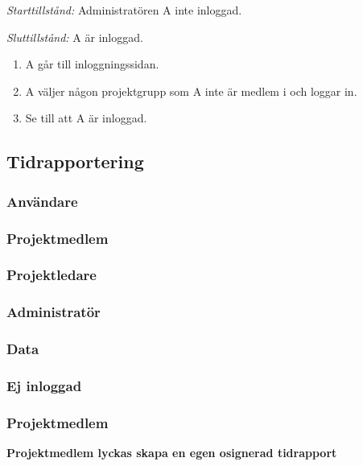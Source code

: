 \documentclass[a4paper]{article}
\begin{document}
\begin{FT}
\emph{Starttillstånd:} Administratören A inte inloggad.

\emph{Sluttillstånd:} A är inloggad.

\begin{enumerate}
\item A går till inloggningssidan.
\item A väljer någon projektgrupp som A inte är medlem i och loggar in.
\item Se till att A är inloggad.
\end{enumerate}



\subsection{Tidrapportering}


\subsubsection{Användare}
\subsubsection{Projektmedlem}
\subsubsection{Projektledare}
\subsubsection{Administratör}
\subsubsection{Data}
\subsubsection{Ej inloggad}


\subsubsection{Projektmedlem}




\item
\textbf{Projektmedlem lyckas skapa en egen osignerad tidrapport}


\end{FT}
\end{document}
